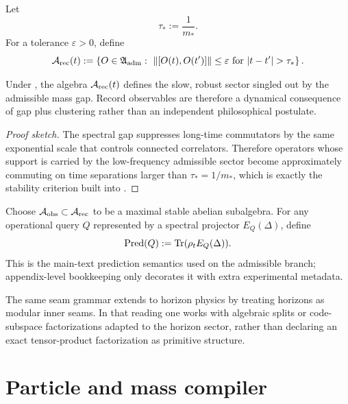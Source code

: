 \begin{definition}
\label{def:stable-record-algebra}
Let
\[
\tau_*:=\frac{1}{m_*}.
\]
For a tolerance $\varepsilon>0$, define
\[
\Arec(t)
:=
\left\{
O\in\mathfrak A_{\mathrm{adm}}
:\ \|[O(t),O(t')]\|\le\varepsilon
\text{ for } |t-t'|>\tau_*
\right\}.
\]
\end{definition}

\begin{proposition}
Under , the algebra $\mathcal A_{\mathrm{rec}}(t)$ defines the slow, robust sector singled out by the admissible mass gap. Record observables are therefore a dynamical consequence of gap plus clustering rather than an independent philosophical postulate.
\end{proposition}

\begin{proof}[Proof sketch]
The spectral gap suppresses long-time commutators by the same exponential scale that controls connected correlators. Therefore operators whose support is carried by the low-frequency admissible sector become approximately commuting on time separations larger than $\tau_*=1/m_*$, which is exactly the stability criterion built into .
\end{proof}

\begin{definition}
\label{def:observer-algebra-prediction}
Choose $\mathcal A_{\mathrm{obs}}\subset\mathcal A_{\mathrm{rec}}$ to be a maximal stable abelian subalgebra. For any operational query $Q$ represented by a spectral projector $E_Q(\Delta)$, define
\[
\operatorname{Pred}(Q):=\operatorname{Tr}(\rho_tE_Q(\Delta)).
\]
This is the main-text prediction semantics used on the admissible branch; appendix-level bookkeeping only decorates it with extra experimental metadata.
\end{definition}

\begin{remark}
The same seam grammar extends to horizon physics by treating horizons as modular inner seams. In that reading one works with algebraic splits or code-subspace factorizations adapted to the horizon sector, rather than declaring an exact tensor-product factorization as primitive structure.
\end{remark}

\section{Particle and mass compiler}

